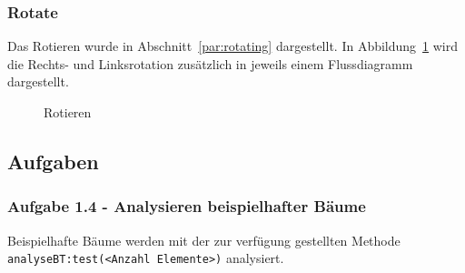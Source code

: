 \subsubsection{Rotate}\label{par:MethodRotate}
Das Rotieren wurde in Abschnitt~\ref{par:rotating} dargestellt.
In Abbildung~\ref{fig:rotate} wird die Rechts- und Linksrotation zusätzlich in jeweils einem
Flussdiagramm dargestellt.
\begin{figure}[hbtp]
    \centering
    \caption{Rotieren}
    \label{fig:rotate}
\end{figure}

\FloatBarrier

\subsection{Aufgaben}\label{subsec:aufgaben}

\subsubsection{Aufgabe 1.4 - Analysieren beispielhafter Bäume}
Beispielhafte Bäume werden mit der zur verfügung gestellten Methode\\
\verb|analyseBT:test(<Anzahl Elemente>)| analysiert.

